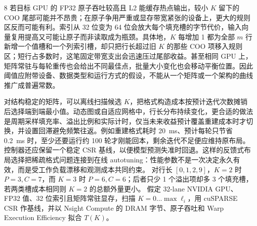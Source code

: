 \begin{solutionexercise}{8}
若目标 GPU 的 FP32 原子吞吐较高且 L2 能缓存热点输出，较小 $K$ 留下的 COO 尾部可能并不昂贵；在原子争用严重或显存带宽紧张的设备上，更大的规则区反而可能有利。索引从 32 位变为 64 位会放大每个填充槽的字节代价，输入向量复用提高又可能让原子而非读取成为瓶颈。具体地，$K$ 每增加 1 都为全部 $m$ 行新增一个值槽和一个列索引槽，却只把行长超过旧 $K$ 的那些 COO 项移入规则区；短行占多数时，这笔固定带宽支出会迅速压过尾部收益。甚至相同 GPU 上，矩阵常驻与每轮重传也会给出不同最佳点，批量大小变化也会移动平衡位置。因此阈值应附带设备、数据类型和运行方式的假设，不能从一个矩阵或一个架构的曲线推广成普遍常数。

对结构稳定的矩阵，可以离线扫描候选 $K$，把格式构造成本按预计迭代次数摊销后选择端到端最小值。动态图或自适应网格中，行长分布持续变化，更合适的做法是周期采样填充率、溢出比例和实际计时，仅当未来收益预计覆盖重建成本时才切换，并设置回滞避免频繁往返。例如重建格式耗时 20~ms、预计每轮只节省 0.2~ms 时，至少还要运行约 100 轮才刚能回本，剩余迭代不足便应维持原布局。控制器还应保留一个稳定 CSR 基线，以便模型预测失准时回退。这样的反馈式布局选择把稀疏格式问题连接到在线 autotuning：性能参数不是一次决定永久有效，而是受工作负载漂移和观测成本共同约束。
\variantheading 对行长 $[0,1,2,9]$，$K=2$ 时 $P=3,C=7$，而 $K=3$ 时 $P=6,C=6$；后者只少 1 个溢出项却多 3 个填充槽，若两类槽成本相同则 $K=2$ 的总额外量更小。
\practiceheading 假定 32-lane NVIDIA GPU、FP32 值、32 位索引且矩阵常驻显存，扫描 $K=0\ldots\max\ell_i$，用 cuSPARSE CSR 作基线，并以 Nsight Compute 的 DRAM 字节、原子吞吐和 Warp Execution Efficiency 拟合 $T(K)$。
\end{solutionexercise}
